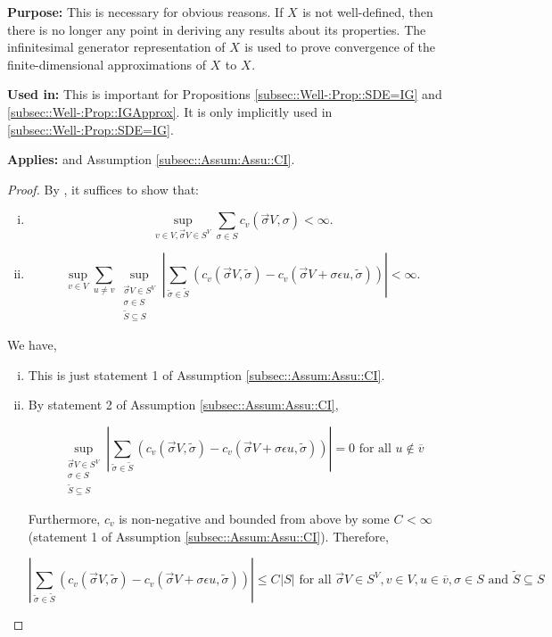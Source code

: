 \documentclass[12pt]{article}
\newcommand{\ov}{\overline}
\newcommand{\te}{\text}
\newcommand{\ep}{\epsilon}
\newcommand{\purpose}{\textbf{Purpose: }}
\newcommand{\usein}{\textbf{Used in: }}
\newcommand{\app}{\textbf{Applies: }}
\renewcommand{\v}{v}							%
\newcommand{\vv}{u}								%
\renewcommand{\S}{S}							%
\newcommand{\s}{\sigma}							%
\newcommand{\sv}{\vec{\s}}						%
\newcommand{\ev}{\ep}							%
\newcommand{\cl}{\ov}							%
\renewcommand{\ss}[1]{^{#1}}					%
\renewcommand{\SS}{\tilde{\S}}						%
\renewcommand{\ss}{\tilde{\s}}					%
\newcommand{\V}{V}									%
\newcommand{\XState}[1]{\S^{#1}}				%
\newcommand{\rxvts}[2]{X_{#1}{#2}}					%
\newcommand{\IGr}[1]{c_{#1}}						%
\newcommand{\const}[1]{C_{#1}}						%
\begin{document}
\purpose This is necessary for obvious reasons. If \(\rxvts{}{}\) is not well-defined, then there is no longer any point in deriving any results about its properties. The infinitesimal generator representation of \(\rxvts{}{}\) is used to prove convergence of the finite-dimensional approximations of \(\rxvts{}{}\) to \(\rxvts{}{}\).

\usein This is important for Propositions \ref{subsec::Well-:Prop::SDE=IG} and \ref{subsec::Well-:Prop::IGApprox}. It is only implicitly used in \ref{subsec::Well-:Prop::SDE=IG}.

\app \cite[Theorem 3.9]{Lig85} and Assumption \ref{subsec::Assum:Assu::CI}.

\begin{proof}
By \cite[Theorem 3.9 (a) and (b)]{Lig85}, it suffices to show that:

\begin{enumerate}[i)]
\item 

\[\sup_{\v \in \V,\sv{}{\V} \in \S^\V} \sum_{\s \in \S} \IGr{\v}(\sv{}{\V},\s) < \infty.\]

\item 

\[\sup_{\v\in \V}\sum_{\vv\neq \v} \sup_{\substack{\sv{}{\V} \in \S^\V\\ \s\in \S\\ \SS \subseteq \S}} \left|\sum_{\ss \in \SS} (\IGr{\v}(\sv{}{\V},\ss) - \IGr{\v}(\sv{}{\V}+\s \ev{\vv},\ss))\right| < \infty.\]
\end{enumerate}

We have,

\begin{enumerate}[i)]
\item This is just statement 1 of Assumption \ref{subsec::Assum:Assu::CI}.

\item By statement 2 of Assumption \ref{subsec::Assum:Assu::CI}, 

\[\sup_{\substack{\sv{}{\V} \in \S^\V\\ \s\in \S\\ \SS\subseteq \S}} \left|\sum_{\ss \in \SS} (\IGr{\v}(\sv{}{\V},\ss) - \IGr{\v}(\sv{}{\V}+\s \ev{\vv},\ss))\right| = 0 \te{ for all } \vv \notin \cl{\v}\]

Furthermore, \(\IGr{\v}\) is non-negative and bounded from above by some \(\const{} < \infty\) (statement 1 of Assumption \ref{subsec::Assum:Assu::CI}). Therefore, 

\[\left|\sum_{\ss \in \SS} (\IGr{\v}(\sv{}{\V},\ss) - \IGr{\v}(\sv{}{\V}+\s\ev{\vv},\ss))\right| \leq \const{}|\S| \te{ for all } \sv{}{\V} \in \S^\V,\v \in \V, \vv \in \cl{\v}, \s \in \S \te{ and } \SS\subseteq \S\]


\end{enumerate}
\end{proof}
\end{document}

